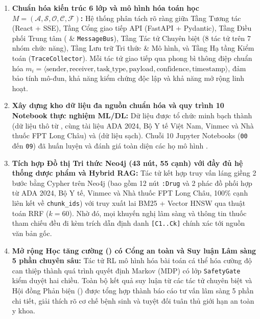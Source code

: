 \begin{enumerate}[leftmargin=1.5em]
  \item \textbf{Chuẩn hóa kiến trúc 6 lớp và mô hình hóa toán học $M = (\mathcal{A}, \mathcal{S}, \mathcal{O}, \mathcal{C}, \mathcal{F})$:}
  Hệ thống phân tách rõ ràng giữa Tầng Tương tác (React + SSE), Tầng Cổng giao tiếp API (FastAPI + Pydantic), Tầng Điều phối Trung tâm ( \& \texttt{MessageBus}), Tầng Tác tử Chuyên biệt (8 tác tử trên 7 nhóm chức năng), Tầng Lưu trữ Tri thức \& Mô hình, và Tầng Hạ tầng Kiểm toán (\texttt{TraceCollector}). Mỗi tác tử giao tiếp qua phong bì thông điệp chuẩn hóa $m_i = \langle \text{sender}, \text{receiver}, \text{task\_type}, \text{payload}, \text{confidence}, \text{timestamp} \rangle$, đảm bảo tính mô-đun, khả năng kiểm chứng độc lập và khả năng mở rộng linh hoạt.

  \item \textbf{Xây dựng kho dữ liệu đa nguồn chuẩn hóa và quy trình 10 Notebook thực nghiệm ML/DL:}
  Dữ liệu được tổ chức minh bạch thành  (dữ liệu thô từ , cùng tài liệu ADA 2024, Bộ Y tế Việt Nam, Vinmec và Nhà thuốc FPT Long Châu) và  (dữ liệu sạch). Chuỗi 10 Jupyter Notebooks (\texttt{00} đến \texttt{09}) đã huấn luyện và đánh giá toàn diện các họ mô hình .

  \item \textbf{Tích hợp Đồ thị Tri thức Neo4j (43 nút, 55 cạnh) với đầy đủ hệ thống dược phẩm và Hybrid RAG:}
  Tác tử  kết hợp truy vấn láng giềng 2 bước bằng Cypher trên Neo4j (bao gồm 12 nút \texttt{:Drug} và 2 phác đồ phối hợp từ ADA 2024, Bộ Y tế, Vinmec và Nhà thuốc FPT Long Châu, 100\% cạnh liên kết về \texttt{chunk\_ids}) với truy xuất lai BM25 + Vector HNSW qua thuật toán RRF ($k = 60$). Nhờ đó, mọi khuyến nghị lâm sàng và thông tin thuốc tham chiếu đều đi kèm trích dẫn định danh \texttt{[C1..Ck]} chính xác tới nguồn văn bản gốc.

  \item \textbf{Mở rộng Học tăng cường () có Cổng an toàn và Suy luận Lâm sàng 5 phần chuyên sâu:}
  Tác tử RL mô hình hóa bài toán cá thể hóa cường độ can thiệp thành quá trình quyết định Markov (MDP) có lớp \texttt{SafetyGate} kiểm duyệt hai chiều. Toàn bộ kết quả suy luận từ các tác tử chuyên biệt và Hội đồng Phản biện () được  tổng hợp thành báo cáo tư vấn lâm sàng 5 phần chi tiết, giải thích rõ cơ chế bệnh sinh và tuyệt đối tuân thủ giới hạn an toàn y khoa.
\end{enumerate}

